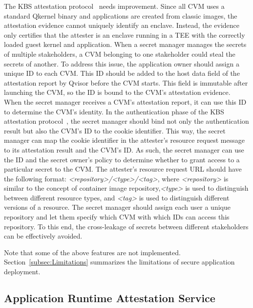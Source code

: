 \label{eq:1}The KBS attestation protocol~\cite*{kbs_Attestation_protocol} needs improvement. Since all \acrshort{CVM} uses a standard Qkernel binary and applications are created from classic images, the attestation evidence cannot uniquely identify an enclave. Instead, the evidence only certifies that the attester is an enclave running in a TEE with the correctly 
loaded guest kernel and application. When a secret manager manages the secrets of multiple stakeholders, a \acrshort{CVM} belonging to one stakeholder could steal the secrets of another. To address this issue, the application owner should assign a unique ID to each CVM. This ID should be added to the host data field of the attestation report by Qvisor before 
the \acrshort{CVM} starts. This field is immutable after launching the \acrshort{CVM}, so the ID is bound to the \acrshort{CVM}'s attestation evidence. When the secret manager receives a \acrshort{CVM}'s attestation report, it can use this ID to determine the \acrshort{CVM}'s identity. In the authentication phase of the KBS attestation 
protocol~\cite*{kbs_Attestation_protocol}, the secret manager should bind not only the authentication result but also the \acrshort{CVM}'s ID to the cookie identifier. This way, the secret manager can map the cookie identifier in the attester's resource request message to its attestation result and the \acrshort{CVM}'s ID. As such, the secret manager can use the 
ID and the secret owner's policy to determine whether to grant access to a particular secret to the \acrshort{CVM}. The attester's resource request URL should have the following format: \emph{<repository>/<type>/<tag>}, where \emph{<repository>} is similar to the concept of container image repository,\emph{<type>} is used to distinguish between different resource 
types, and \emph{<tag>} is used to distinguish different versions of a resource. The secret manager should assign each user a unique repository and let them specify which \acrshort{CVM} with which IDs can access this repository. To this end, the cross-leakage of secrets between different stakeholders can be effectively avoided. 


Note that some of the above features are not implemented. Section~\ref{subsec:Limitations} summarizes the limitations of secure application deployment.

\subsection{Application Runtime Attestation Service}
\label{sec:runtime_attesation}

